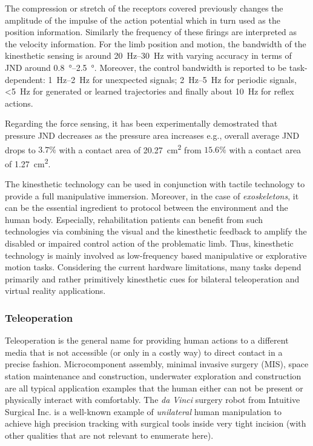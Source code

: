 The compression or stretch of the receptors covered previously changes the amplitude of the impulse of the action potential which in turn used as the position information. Similarly the frequency of these firings are interpreted as the velocity information. For the limb position and motion, the bandwidth of the kinesthetic sensing is around \SIrange{20}{30}{\hertz} with varying accuracy in terms of JND around \SIrange{0.8}{2.5}{\degree}. Moreover, the control bandwidth is reported to be task-dependent: \SIrange{1}{2}{\hertz} for unexpected signals; \SIrange{2}{5}{\hertz} for periodic signals, \SI[parse-numbers=false]{<5}{\hertz} for generated or learned trajectories and finally about \SI{10}{\hertz} for reflex actions. 

Regarding the force sensing, it has been experimentally demostrated that pressure JND decreases as the pressure area increases e.g., overall average JND drops to $3.7\%$ with a contact area of \SI{20.27}{\centi\meter\squared} from $15.6\%$ with a contact area of \SI{1.27}{\centi\meter\squared}. 

The kinesthetic technology can be used in conjunction with tactile technology to provide a full manipulative immersion. Moreover, in the case of \emph{exoskeletons}, it can be the essential ingredient to protocol between the environment and the human body. Especially, rehabilitation patients can benefit from such technologies via combining the visual and the kinesthetic feedback to amplify the disabled or impaired control action of the problematic limb. Thus, kinesthetic technology is mainly involved as low-frequency based manipulative or explorative motion tasks. Considering the current hardware limitations, many tasks depend primarily and rather primitively kinesthetic cues for bilateral teleoperation and virtual reality applications.


\subsubsection{Teleoperation}
Teleoperation is the general name for providing human actions to a different media that is not accessible (or only in a costly way) to direct contact in a precise fashion. Microcomponent assembly, minimal invasive surgery (MIS), space station maintenance and construction, underwater exploration and construction are all typical application examples that the human either can not be present or physically interact with comfortably. The \emph{da Vinci}\raisebox{0.5ex}{\scriptsize\texttrademark} surgery robot from Intuitive Surgical Inc. is a well-known example of \emph{unilateral} human manipulation to achieve high precision tracking with surgical tools inside very tight incision (with other qualities that are not relevant to enumerate here). 

